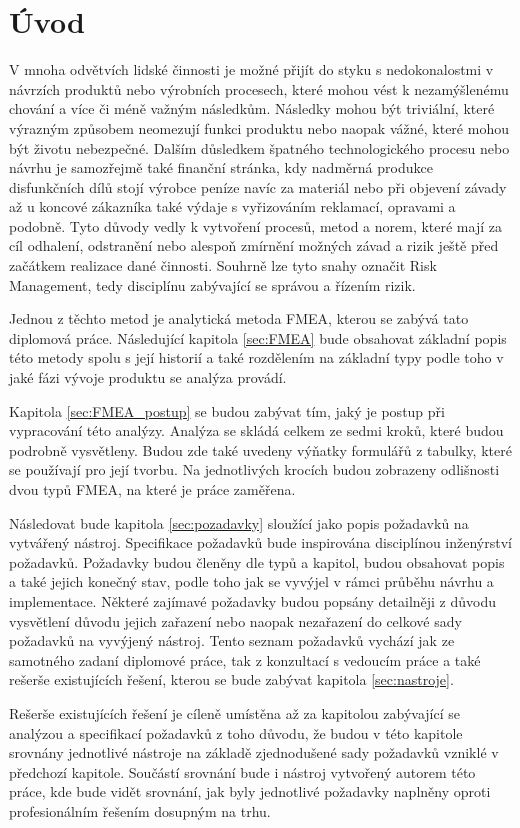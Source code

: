 \chapter{Úvod}
\label{sec:Uvod}
V mnoha odvětvích lidské činnosti je možné přijít do styku s nedokonalostmi v návrzích produktů nebo výrobních procesech, které mohou vést k nezamýšlenému chování a více či méně važným následkům. Následky mohou být triviální, které výrazným způsobem neomezují funkci produktu nebo naopak vážné, které mohou být životu nebezpečné. Dalším důsledkem špatného technologického procesu nebo návrhu je samozřejmě také finanční stránka, kdy nadměrná produkce disfunkčních dílů stojí výrobce peníze navíc za materiál nebo při objevení závady až u koncové zákazníka také výdaje s vyřizováním reklamací, opravami a podobně. Tyto důvody vedly k vytvoření procesů, metod a norem, které mají za cíl odhalení, odstranění nebo alespoň zmírnění možných závad a rizik ještě před začátkem realizace dané činnosti. Souhrně lze tyto snahy označit Risk Management, tedy disciplínu zabývající se správou a řízením rizik. 

Jednou z těchto metod je analytická metoda FMEA, kterou se zabývá tato diplomová práce. Následující kapitola  \ref{sec:FMEA} bude obsahovat základní popis této metody spolu s její historií a také rozdělením na základní typy podle toho v jaké fázi vývoje produktu se analýza provádí.

Kapitola \ref{sec:FMEA_postup} se budou zabývat tím, jaký je postup při vypracování této analýzy. Analýza se skládá celkem ze sedmi kroků, které budou podrobně vysvětleny. Budou zde také uvedeny výňatky formulářů z tabulky, které se používají pro její tvorbu. Na jednotlivých krocích budou zobrazeny odlišnosti dvou typů FMEA, na které je práce zaměřena.

Následovat bude kapitola \ref{sec:pozadavky} sloužící jako popis požadavků na vytvářený nástroj. Specifikace požadavků bude inspirována disciplínou inženýrství požadavků. Požadavky budou členěny dle typů a kapitol, budou obsahovat popis a také jejich konečný stav, podle toho jak se vyvýjel v rámci průběhu návrhu a implementace. Některé zajímavé požadavky budou popsány detailněji z důvodu vysvětlení důvodu jejich zařazení nebo naopak nezařazení do celkové sady požadavků na vyvýjený nástroj. Tento seznam požadavků vychází jak ze samotného zadaní diplomové práce, tak z konzultací s vedoucím práce a také rešerše existujících řešení, kterou se bude zabývat kapitola \ref{sec:nastroje}. 

Rešerše existujících řešení je cíleně umístěna až za kapitolou zabývající se analýzou a specifikací požadavků z toho důvodu, že budou v této kapitole srovnány jednotlivé nástroje na základě zjednodušené sady požadavků vzniklé v předchozí kapitole. Součástí srovnání bude i nástroj vytvořený autorem této práce, kde bude vidět srovnání, jak byly jednotlivé požadavky naplněny oproti profesionálním řešením dosupným na trhu. 

